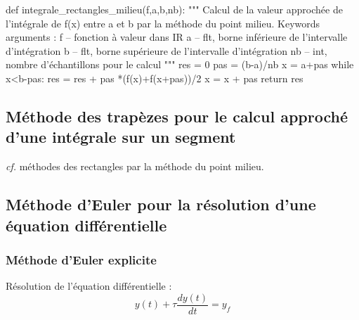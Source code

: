 \documentclass[10pt]{article}
\begin{document}
\begin{py}
\begin{python}
def integrale_rectangles_milieu(f,a,b,nb):
    """
    Calcul de la valeur approchée de l'intégrale de f(x) entre a et b par la 
    méthode du point milieu.
    Keywords arguments :
    f -- fonction à valeur dans IR
    a -- flt, borne inférieure de l'intervalle d'intégration
    b -- flt, borne supérieure de l'intervalle d'intégration
    nb -- int, nombre d'échantillons pour le calcul
    """
    res = 0
    pas = (b-a)/nb
    x = a+pas
    while x<b-pas:
        res = res + pas *(f(x)+f(x+pas))/2
        x = x + pas
    return res
\end{python}
\end{py}

\subsection{Méthode des trapèzes pour le calcul approché d'une intégrale sur un segment}
\textit{cf.} méthodes des rectangles par la méthode du point milieu.

\subsection{Méthode d'Euler pour la résolution d'une équation différentielle}

\subsubsection{Méthode d'Euler explicite}
Résolution de l'équation différentielle :
$$
y(t) + \tau\dfrac{dy(t)}{dt} = y_f
$$
\end{document}
